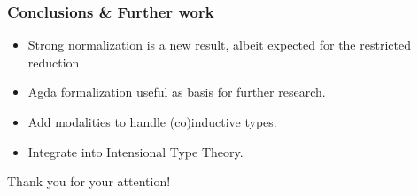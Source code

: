 \documentclass[t]{beamer}
\newcommand{\cAnn}{\color{red!80!black}}%
\renewcommand{\emph}[1]{{\cAnn#1}}
\begin{document}
\begin{frame}%
  \frametitle{Conclusions \& Further work}
  \begin{itemize}
  \item \emph{Strong} normalization is a new result, albeit expected for the restricted reduction.
  \item Agda formalization useful as basis for further research.
  \item Add modalities to handle (co)inductive types.
  \item Integrate into Intensional Type Theory.
  \end{itemize}
  \vspace{20pt}
  \begin{center}
  {\Large Thank you for your attention!}
  \end{center}
\end{frame}




% 
\end{document}
